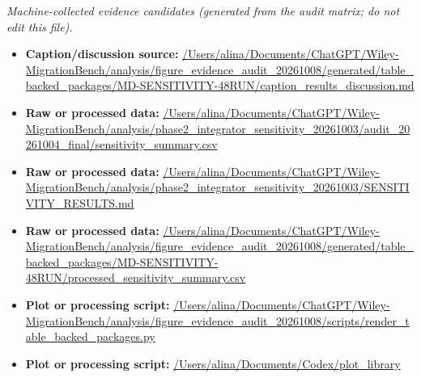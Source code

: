 \emph{Machine-collected evidence candidates (generated from the audit matrix; do not edit this file).}
\begin{itemize}[leftmargin=1.4em,noitemsep]
\item \textbf{Caption/discussion source:} \url{/Users/alina/Documents/ChatGPT/Wiley-MigrationBench/analysis/figure_evidence_audit_20261008/generated/table_backed_packages/MD-SENSITIVITY-48RUN/caption_results_discussion.md}
\item \textbf{Raw or processed data:} \url{/Users/alina/Documents/ChatGPT/Wiley-MigrationBench/analysis/phase2_integrator_sensitivity_20261003/audit_20261004_final/sensitivity_summary.csv}
\item \textbf{Raw or processed data:} \url{/Users/alina/Documents/ChatGPT/Wiley-MigrationBench/analysis/phase2_integrator_sensitivity_20261003/SENSITIVITY_RESULTS.md}
\item \textbf{Raw or processed data:} \url{/Users/alina/Documents/ChatGPT/Wiley-MigrationBench/analysis/figure_evidence_audit_20261008/generated/table_backed_packages/MD-SENSITIVITY-48RUN/processed_sensitivity_summary.csv}
\item \textbf{Plot or processing script:} \url{/Users/alina/Documents/ChatGPT/Wiley-MigrationBench/analysis/figure_evidence_audit_20261008/scripts/render_table_backed_packages.py}
\item \textbf{Plot or processing script:} \url{/Users/alina/Documents/Codex/plot_library}
\end{itemize}
